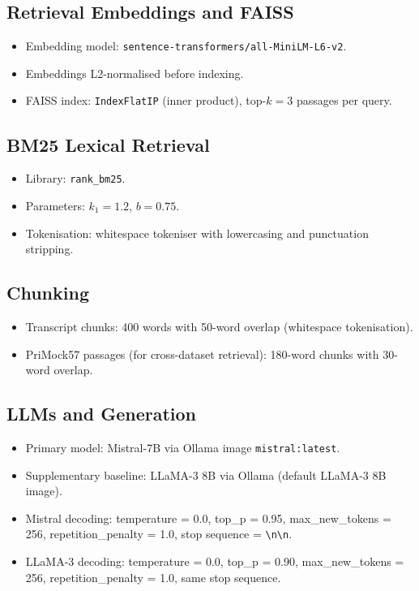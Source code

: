 \documentclass[11pt,a4paper]{article}
\begin{document}
\subsection*{Retrieval Embeddings and FAISS}
\begin{itemize}[leftmargin=1.4em]
  \item Embedding model: \texttt{sentence-transformers/all-MiniLM-L6-v2}.
  \item Embeddings L2-normalised before indexing.
  \item FAISS index: \texttt{IndexFlatIP} (inner product), top-$k = 3$ passages per query.
\end{itemize}

\subsection*{BM25 Lexical Retrieval}
\begin{itemize}[leftmargin=1.4em]
  \item Library: \texttt{rank\_bm25}.
  \item Parameters: $k_1 = 1.2$, $b = 0.75$.
  \item Tokenisation: whitespace tokeniser with lowercasing and punctuation stripping.
\end{itemize}

\subsection*{Chunking}
\begin{itemize}[leftmargin=1.4em]
  \item Transcript chunks: 400 words with 50-word overlap (whitespace tokenisation).
  \item PriMock57 passages (for cross-dataset retrieval): 180-word chunks with 30-word overlap.
\end{itemize}

\subsection*{LLMs and Generation}
\begin{itemize}[leftmargin=1.4em]
  \item Primary model: Mistral-7B via Ollama image \texttt{mistral:latest}.
  \item Supplementary baseline: LLaMA-3 8B via Ollama (default LLaMA-3 8B image).
  \item Mistral decoding: temperature = 0.0, top\_p = 0.95, max\_new\_tokens = 256,
        repetition\_penalty = 1.0, stop sequence = \verb|\n\n|.
  \item LLaMA-3 decoding: temperature = 0.0, top\_p = 0.90, max\_new\_tokens = 256,
        repetition\_penalty = 1.0, same stop sequence.
\end{itemize}
\end{document}
